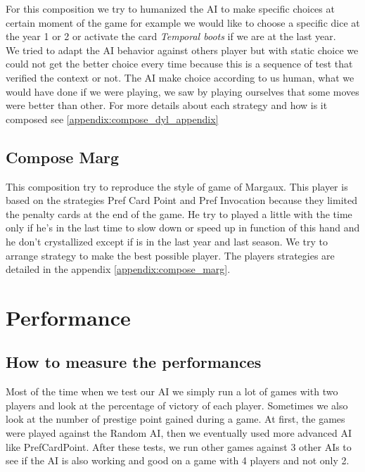             For this composition we try to humanized the AI to make specific choices at certain moment of the game for example we would like to choose a specific dice at the year 1 or 2 or activate the card \textit{Temporal boots} if we are at the last year.  \\
            We tried to adapt the AI behavior against others player but with static choice we could not get the better choice every time because this is a sequence of test that verified the context or not. 
            The AI make choice according to us human, what we would have done if we were playing, we saw by playing ourselves that some moves were better than other. For more details about each strategy and how is it composed see \ref{appendix:compose_dyl_appendix} 
            
            
            
            \subsection{Compose Marg}
            This composition try to reproduce the style of game of Margaux. This player is based on the strategies Pref Card Point and Pref Invocation because they limited the penalty cards at the end of the game. He try to played a little with the time only if he's in the last time to slow down or speed up in function of this hand and he don't crystallized except if is in the last year and last season. We try to arrange strategy to make the best possible player. The players strategies are detailed in the appendix \ref{appendix:compose_marg}.
            
    \newpage
    \section{Performance}
        
        \subsection{How to measure the performances}
            Most of the time when we test our AI we simply run a lot of games with two players and look at the percentage of victory of each player. Sometimes we also look at the number of prestige point gained during a game.
            At first, the games were played against the Random AI, then we eventually used more advanced AI like PrefCardPoint.
            After these tests, we run other games against 3 other AIs to see if the AI is also working and good on a game with 4 players and not only 2.

